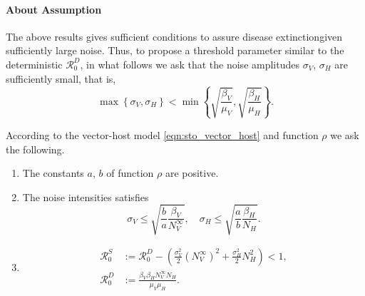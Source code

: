 \paragraph{About Assumption}
The above results gives sufficient conditions to assure 
disease extinction\textemdash given sufficiently large noise. Thus, 
to propose a threshold parameter similar  to the deterministic
$\mathcal{R}_0^D$, in what follows we ask that the noise amplitudes 
$\sigma_V$, $\sigma_H$ are sufficiently small, that is,
\begin{equation}\label{eqn:noise_small_condition}
    \displaystyle
    \max
        \left \{
              \sigma_V, \sigma_H 
        \right\} 
        < 
    \min 
        \left \{
            \sqrt{\frac{\beta_V}{\mu_V}},
            \sqrt{\frac{\beta_H}{\mu_H}}
        \right \}.
\end{equation}
%
%
%
\begin{assumption}\label{ass:extinction}
    According to the vector-host model \eqref{eqn:sto_vector_host} and 
    function
    $\rho$
    we ask the following.
    \begin{enumerate}[\bf{(E-}1)]
        \item 
            The constants $a$, $b$ of function $\rho$ are positive.
        \item \label{ass:noise_condition}
            The noise intensities satisfies
            $$
                \sigma_V \leq 
                    \sqrt{
                        \frac{b}{a}
                        \frac{\beta_V}{N_V^{\infty}}
                        },
                 \quad
                \sigma_H \leq
                    \sqrt{
                        \frac{a}{b}
                        \frac{\beta_H }{N_H
                    }}.
            $$
        \item
            \begin{equation*}
                \begin{aligned}
                    \mathcal{R}_0 ^ S &:=
                        \mathcal{R}_0^D - 
                        \left( 
                            \frac{\sigma_V ^ 2}{2} (N_V ^ {\infty}) ^ 2
                            +
                            \frac{\sigma_H ^ 2}{2} N_H ^ 2
                        \right)
                        <1,
                        \\
                    \mathcal{R}_0 ^ D &:=
                            \frac{
                                \beta_V \beta_H N_V ^ \infty N_H}{\mu_V \mu_H} .
                \end{aligned}
            \end{equation*}
    \end{enumerate}
\end{assumption}        
